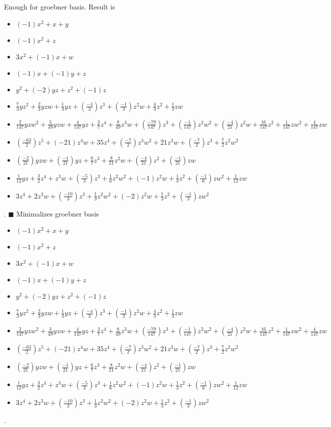 Enough for groebner basis.  Result is \begin{itemize}
\item $(-1)x^{2}+x+y$
\item $(-1)x^{2}+z$
\item $3x^{2}+(-1)x+w$
\item $(-1)x+(-1)y+z$
\item $y^{2}+(-2)yz+z^{2}+(-1)z$
\item $\frac{7}{3}yz^{2}+\frac{2}{3}yzw+\frac{1}{3}yz+(\frac{-4}{3})z^{3}+(\frac{-1}{3})z^{2}w+\frac{4}{3}z^{2}+\frac{1}{3}zw$
\item $\frac{2}{147}yzw^{2}+\frac{3}{49}yzw+\frac{4}{147}yz+\frac{3}{7}z^{4}+\frac{8}{49}z^{3}w+(\frac{-79}{147})z^{3}+(\frac{-1}{147})z^{2}w^{2}+(\frac{-4}{21})z^{2}w+\frac{16}{147}z^{2}+\frac{1}{147}zw^{2}+\frac{4}{147}zw$
\item $(\frac{-63}{2})z^{5}+(-21)z^{4}w+35z^{4}+(\frac{-7}{2})z^{3}w^{2}+21z^{3}w+(\frac{-7}{2})z^{3}+\frac{7}{2}z^{2}w^{2}$
\item $(\frac{-2}{21})yzw+(\frac{-1}{21})yz+\frac{6}{7}z^{3}+\frac{8}{21}z^{2}w+(\frac{-4}{21})z^{2}+(\frac{-1}{21})zw$
\item $\frac{1}{12}yz+\frac{3}{2}z^{4}+z^{3}w+(\frac{-5}{3})z^{3}+\frac{1}{6}z^{2}w^{2}+(-1)z^{2}w+\frac{1}{3}z^{2}+(\frac{-1}{6})zw^{2}+\frac{1}{12}zw$
\item $3z^{4}+2z^{3}w+(\frac{-10}{3})z^{3}+\frac{1}{3}z^{2}w^{2}+(-2)z^{2}w+\frac{1}{3}z^{2}+(\frac{-1}{3})zw^{2}$
\end{itemize}  .
$\blacksquare{}$
Minimalizes groebner basis
\begin{itemize}
\item $(-1)x^{2}+x+y$
\item $(-1)x^{2}+z$
\item $3x^{2}+(-1)x+w$
\item $(-1)x+(-1)y+z$
\item $y^{2}+(-2)yz+z^{2}+(-1)z$
\item $\frac{7}{3}yz^{2}+\frac{2}{3}yzw+\frac{1}{3}yz+(\frac{-4}{3})z^{3}+(\frac{-1}{3})z^{2}w+\frac{4}{3}z^{2}+\frac{1}{3}zw$
\item $\frac{2}{147}yzw^{2}+\frac{3}{49}yzw+\frac{4}{147}yz+\frac{3}{7}z^{4}+\frac{8}{49}z^{3}w+(\frac{-79}{147})z^{3}+(\frac{-1}{147})z^{2}w^{2}+(\frac{-4}{21})z^{2}w+\frac{16}{147}z^{2}+\frac{1}{147}zw^{2}+\frac{4}{147}zw$
\item $(\frac{-63}{2})z^{5}+(-21)z^{4}w+35z^{4}+(\frac{-7}{2})z^{3}w^{2}+21z^{3}w+(\frac{-7}{2})z^{3}+\frac{7}{2}z^{2}w^{2}$
\item $(\frac{-2}{21})yzw+(\frac{-1}{21})yz+\frac{6}{7}z^{3}+\frac{8}{21}z^{2}w+(\frac{-4}{21})z^{2}+(\frac{-1}{21})zw$
\item $\frac{1}{12}yz+\frac{3}{2}z^{4}+z^{3}w+(\frac{-5}{3})z^{3}+\frac{1}{6}z^{2}w^{2}+(-1)z^{2}w+\frac{1}{3}z^{2}+(\frac{-1}{6})zw^{2}+\frac{1}{12}zw$
\item $3z^{4}+2z^{3}w+(\frac{-10}{3})z^{3}+\frac{1}{3}z^{2}w^{2}+(-2)z^{2}w+\frac{1}{3}z^{2}+(\frac{-1}{3})zw^{2}$
\end{itemize}  .


